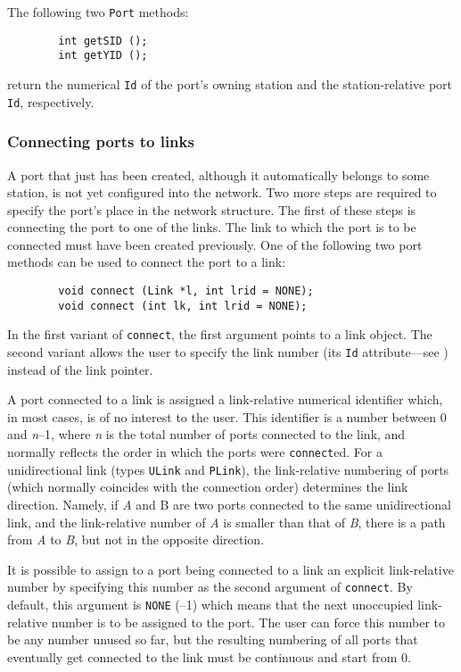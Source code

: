 The following two {\tt Port} methods:
\begin{verbatim}
        int getSID ();
        int getYID ();
\end{verbatim}
return the numerical {\tt Id} of the port's owning station and the
station-relative port {\tt Id}, respectively.

\subsubsection{Connecting ports to links}
\label{rm_to_po_co}

A port that just has been created, although it automatically belongs to
some station, is not yet configured into the network.
Two more steps are required to specify the port's place in the network
structure.
The first of these steps is connecting the port to one of the links.
The link to which the port is to be connected must have been
created previously.
One of the following two port methods can be used to connect the port to a link:
\begin{verbatim}
        void connect (Link *l, int lrid = NONE);
        void connect (int lk, int lrid = NONE);
\end{verbatim}

In the first variant of {\tt connect}, the first argument points to
a link object.
The second variant allows the user to specify the link number (its {\tt Id}
attribute---see ) instead of the link pointer.

A port connected to a link is assigned a link-relative numerical identifier
which, in most cases, is of no interest to the user.
This identifier is a number between 0 and
{\em n\/}--1, where {\em n\/} is the total
number of ports connected to the link, and normally reflects the order
in which the ports were {\tt connect}ed.
For a unidirectional link (types {\tt ULink} and {\tt PLink}), the 
link-relative numbering of ports (which normally coincides with the
connection order) determines the link direction.
Namely, if {\em A\/} and {\rm B\/} are two ports connected to the same unidirectional
link, and the link-relative number of {\em A\/} is smaller than that of {\em B},
there is a path from {\em A\/} to {\em B}, but not in the opposite direction.

It is possible to assign to a port being connected to a link an explicit
link-relative number by specifying this number as the second
argument of {\tt connect}.
By default, this argument is {\tt NONE} (--1) which means that the next
unoccupied link-relative number is to be assigned to the port.
The user can force this number to be any number unused so far, but the
resulting numbering of all ports that eventually get connected to the link
must be continuous and start from 0.


